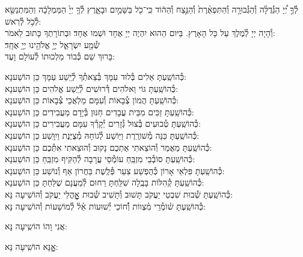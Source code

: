 \documentclass[twoside, openany, parskip=half, 11pt]{book}
\begin{document}
לְ֯ךָ֣ יְ֠יָ הַגְּ֯דֻלָּ֨ה וְ֯הַגְּ֯בוּרָ֤ה וְ֯הַתִּפְאֶ֨רֶת֙ וְ֯הַנֵּ֣צַח וְ֯הַה֔וֹד
כִּֽי־כֹ֖ל בַּשָּׁמַ֣יִם וּבָאָ֑רֶץ לְ֯ךָ֤ יְיָ֙ הַמַּמְלָכָ֔ה
וְהַמִּתְנַשֵּׂ֖א לְ֯כֹ֥ל לְ֯רֹֽאשׁ:\\
וְ֯הָיָה יְיָ לְ֯מֶלֶךְ עַל כָּל הָאָרֶץ. בַּיּום הַהוּא יִהְיֶה יְיָ אֶחָד וּשְׁמו אֶחָד׃ וּבְתוֹרָתְךָ כָּתוּב לֵאמֹר: \\
שְׁ֯מַ֖ע יִשְׂרָאֵ֑ל יְיָ֥ אֱלֹהֵ֖ינוּ יְיָ֥ אֶחָֽד׃\\
בָּרוּךְ שֵׁם כְּ֯בוֹד מַלְכוּתוֹ לְ֯עוֹלָם וָעֶד:

\begin{small}
כְּ֯הוֹשַֽׁעְתָּ אֵלִים בְּ֯לוּד עִמָּךְ בְּ֯צֵאתְ֯ךָ לְ֯יֵֽשַׁע עַמָּךְ \hfill כֵּן הוֹשַׁענָא: \\
כְּ֯הוֹשַֽׁעְתָּ גּוֹי וֵאלֹהִים דְּ֯רוּשִׁים לְ֯יֵֽשַׁע אֱלֹהִים \hfill כֵּן הוֹשַׁענָא: \\
כְּ֯הוֹשַֽׁעְתָּ הֲמוֹן צְ֯בָאוֹת וְ֯עִמָּם מַלְאֲכֵי צְ֯בָאוֹת \hfill כֵּן הוֹשַׁענָא: \\
כְּ֯הוֹשַֽׁעְתָּ זַכִּים מִבֵּית עֲבָדִים חַנּוּן בְּ֯יָדָם מַעֲבִידִים \hfill כֵּן הוֹשַׁענָא: \\
כְּ֯הוֹשַֽׁעְתָּ טְ֯בוּעִים בְּ֯צוּל גְּ֯זָרִים יְ֯קָרְ֯ךָ עִמָּם מַעֲבִירִים \hfill כֵּן הוֹשַׁענָא: \\
כְּ֯הוֹשַֽׁעְתָּ כַּנָּה מְ֯שׁוֹרֶֽרֶת וַיּֽוֹשַׁע לְ֯גוֹחָהּ מְ֯צֻיֶּנֶת וַיִוָּֽשַׁע \hfill כֵּן הוֹשַׁענָא: \\
כְּ֯הוֹשַֽׁעְתָּ מַאֲמַר וְ֯הוֹצֵאתִי אֶתְכֶם נָקוּב וְ֯הוּצֵאתִי אִתְּ֯כֶם \hfill כֵּן הוֹשַׁענָא:\\
כְּ֯הוֹשַֽׁעְתָּ סוֹבְ֯בֵי מִזְבֵּֽחַ עוֹמְ֯סֵי עֲרָבָה לְ֯הַקִּיף מִזְבֵּֽחַ \hfill כֵּן הוֹשַׁענָא: \\
כְּ֯הוֹשַֽׁעְתָּ פִּלְאֵי אָרוֹן כְּ֯הֻפְשַׁע צִעֵר פְּ֯לֶֽשֶׁת בַּחֲרוֹן אַף וְ֯נוֹשַׁע \hfill כֵּן הוֹשַׁענָא: \\
כְּ֯הוֹשַֽׁעְתָּ קְ֯הִלּוֹת בָּבֶֽלָה שִׁלַּֽחְתָּ רַחוּם לְ֯מַעֲנָם שֻׁלַּחְתָּ \hfill כֵּן הוֹשַׁענָא:\\
כְּ֯הוֹשַֽׁעְתָּ שְׁ֯בוּת שִׁבְטֵי יַעֲקֹב תָּשׁוּב וְ֯תָשִׁיב שְׁ֯בוּת אׇׇׇׇׇׇׇׇהֳלֵי יַעֲקֹב \hfill וְ֯הוֹשִׁיעָה נָּא:\\
כְּ֯הוֹשַֽׁעְתָּ שׁ֗וֹמְ֯רֵי מִ֗צְווֹת וְ֯֗חוֹכֵי יְ֯שׁוּעוֹת אֵ֗ל֗ לְ֯מוֹשָׁעוֹת \hfill וְ֯הוֹשִׁיעָה נָּא:

\end{small}

\begin{large}
\chazzan
אֲנִי וָהוֹ הוֹשִֽיעָה נָּא:

\shatzvkahal
אׇׇׇׇנָּא הוֹשִֽׁיעָה נָּא:

\end{large}
\end{document}
